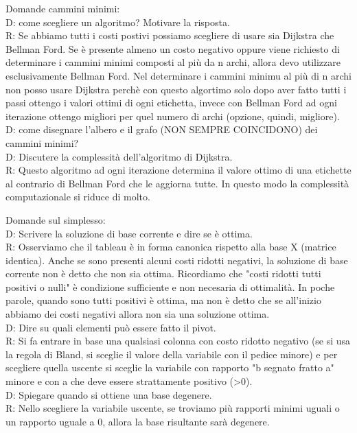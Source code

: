 \documentclass[10pt,                    %
               a4paper,                 %
               twoside,                 %
               openright,               %
               english,                 
               italian,                 
]{article}
\begin{document}
Domande cammini minimi: \\
D: come scegliere un algoritmo? Motivare la risposta. \\
R: Se abbiamo tutti i costi postivi possiamo scegliere di usare sia Dijkstra che Bellman Ford. Se è presente almeno un costo negativo oppure viene richiesto di determinare i cammini minimi composti al più da n archi, allora devo utilizzare esclusivamente Bellman Ford. Nel determinare i cammini minimu al più di n archi non posso usare Dijkstra perchè con questo algortimo solo dopo aver fatto tutti i passi ottengo i valori ottimi di ogni etichetta, invece con Bellman Ford ad ogni iterazione ottengo migliori per quel numero di archi (opzione, quindi, migliore). \\

D: come disegnare l'albero e il grafo (NON SEMPRE COINCIDONO) dei cammini minimi?
\\

D: Discutere la complessità dell'algoritmo di Dijkstra. \\
R: Questo algoritmo ad ogni iterazione determina il valore ottimo di una etichette al contrario di Bellman Ford che le aggiorna tutte. In questo modo la complessità computazionale si riduce di molto.  

Domande sul simplesso: \\
D: Scrivere la soluzione di base corrente e dire se è ottima. \\
R: Osserviamo che il tableau è in forma canonica rispetto alla base X (matrice identica). Anche se sono presenti alcuni costi ridotti negativi, la soluzione di base corrente non è detto che non sia ottima. Ricordiamo che "costi ridotti tutti positivi o nulli" è condizione sufficiente e non necesaria di ottimalità. In poche parole, quando sono tutti positivi è ottima, ma non è detto che se all'inizio abbiamo dei costi negativi allora non sia una soluzione ottima. \\

D: Dire su quali elementi può essere fatto il pivot. \\
R: Si fa entrare in base una qualsiasi colonna con costo ridotto negativo (se si usa la regola di Bland, si sceglie il valore della variabile con il pedice minore) e per scegliere quella uscente si sceglie la variabile con rapporto "b segnato fratto a" minore e con a che deve essere strattamente positivo (>0). \\

D: Spiegare quando si ottiene una base degenere. \\
R: Nello scegliere la variabile uscente, se troviamo più rapporti minimi uguali o un rapporto uguale a 0, allora la base risultante sarà degenere. \\
\end{document}
